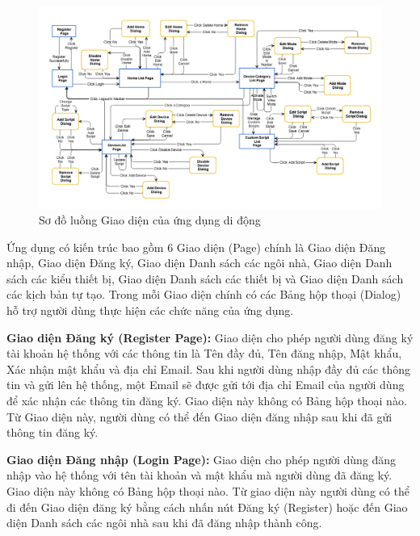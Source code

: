 \documentclass[11pt,a4paper,oneside]{book}
\begin{document}
\begin{figure}[h]
  \centering
     \includegraphics[width=16cm]{5-UI-Flow}
  \caption{Sơ đồ luồng Giao diện của ứng dụng di động}\label{fig:5-UI-Flow}
\end{figure}

Ứng dụng có kiến trúc bao gồm 6 Giao diện (Page) chính là Giao diện Đăng nhập, Giao diện Đăng ký, Giao diện Danh sách các ngôi nhà, Giao diện Danh sách các kiểu thiết bị, Giao diện Danh sách các thiết bị và Giao diện Danh sách các kịch bản tự tạo. Trong mỗi Giao diện chính có các Bảng hộp thoại (Dialog) hỗ trợ người dùng thực hiện các chức năng của ứng dụng.

\textbf{Giao diện Đăng ký (Register Page):} Giao diện cho phép người dùng đăng ký tài khoản hệ thống với các thông tin là Tên đầy đủ, Tên đăng nhập, Mật khẩu, Xác nhận mật khẩu và địa chỉ Email. Sau khi người dùng nhập đầy đủ các thông tin và gửi lên hệ thống, một Email sẽ được gửi tới địa chỉ Email của người dùng để xác nhận các thông tin đăng ký. Giao diện này không có Bảng hộp thoại nào. Từ Giao diện này, người dùng có thể đến Giao diện đăng nhập sau khi đã gửi thông tin đăng ký.

\textbf{Giao diện Đăng nhập (Login Page):} Giao diện cho phép người dùng đăng nhập vào hệ thống với tên tài khoản và mật khẩu mà người dùng đã đăng ký. Giao diện này không có Bảng hộp thoại nào. Từ giao diện này người dùng có thể đi đến Giao diện đăng ký bằng cách nhấn nút Đăng ký (Register) hoặc đến Giao diện Danh sách các ngôi nhà sau khi đã đăng nhập thành công.
\end{document}
